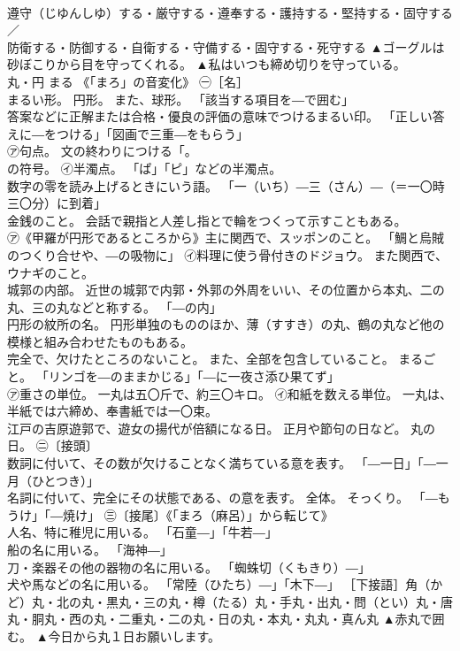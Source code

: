 \documentclass[8pt]{extreport}
\begin{document}
\begin{CJK}{UTF8}{min}
\\	遵守（じゆんしゆ）する・厳守する・遵奉する・護持する・堅持する・固守する／
\\	防衛する・防御する・自衛する・守備する・固守する・死守する	▲ゴーグルは砂ぼこりから目を守ってくれる。 ▲私はいつも締め切りを守っている。
\\	丸・円	まる	《「まろ」の音変化》 ㊀［名］ 
\\	まるい形。 円形。 また、球形。 「該当する項目を―で囲む」 
\\	答案などに正解または合格・優良の評価の意味でつけるまるい印。 「正しい答えに―をつける」「図画で三重―をもらう」 
\\	㋐句点。 文の終わりにつける「。 
\\	の符号。 ㋑半濁点。 「ぱ」「ピ」などの半濁点。 
\\	数字の零を読み上げるときにいう語。 「一（いち）―三（さん）―（＝一〇時三〇分）に到着」 
\\	金銭のこと。 会話で親指と人差し指とで輪をつくって示すこともある。 
\\	㋐《甲羅が円形であるところから》主に関西で、スッポンのこと。 「鯛と烏賊のつくり合せや、―の吸物に」 ㋑料理に使う骨付きのドジョウ。 また関西で、ウナギのこと。 
\\	城郭の内部。 近世の城郭で内郭・外郭の外周をいい、その位置から本丸、二の丸、三の丸などと称する。 「―の内」 
\\	円形の紋所の名。 円形単独のもののほか、薄（すすき）の丸、鶴の丸など他の模様と組み合わせたものもある。 
\\	完全で、欠けたところのないこと。 また、全部を包含していること。 まるごと。 「リンゴを―のままかじる」「―に一夜さ添ひ果てず」 
\\	㋐重さの単位。 一丸は五〇斤で、約三〇キロ。 ㋑和紙を数える単位。 一丸は、半紙では六締め、奉書紙では一〇束。 
\\	江戸の吉原遊郭で、遊女の揚代が倍額になる日。 正月や節句の日など。 丸の日。 ㊁〔接頭〕 
\\	数詞に付いて、その数が欠けることなく満ちている意を表す。 「―一日」「―一月（ひとつき）」 
\\	名詞に付いて、完全にその状態である、の意を表す。 全体。 そっくり。 「―もうけ」「―焼け」 ㊂〔接尾〕《「まろ（麻呂）」から転じて》 
\\	人名、特に稚児に用いる。 「石童―」「牛若―」 
\\	船の名に用いる。 「海神―」 
\\	刀・楽器その他の器物の名に用いる。 「蜘蛛切（くもきり）―」 
\\	犬や馬などの名に用いる。 「常陸（ひたち）―」「木下―」 ［下接語］角（かど）丸・北の丸・黒丸・三の丸・樽（たる）丸・手丸・出丸・問（とい）丸・唐丸・胴丸・西の丸・二重丸・二の丸・日の丸・本丸・丸丸・真ん丸	▲赤丸で囲む。 ▲今日から丸１日お願いします。

\end{CJK}
\end{document}
